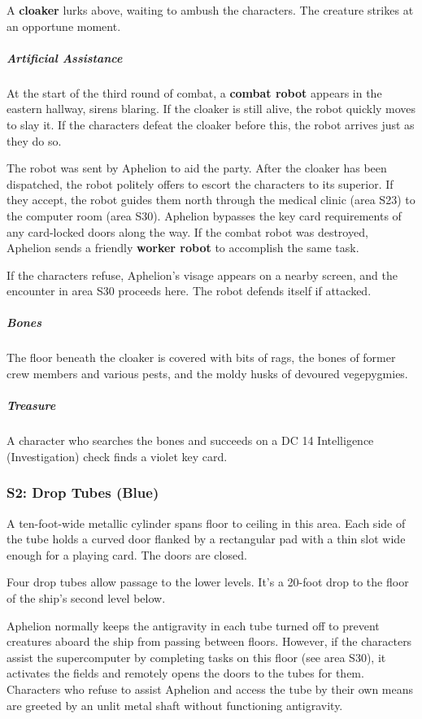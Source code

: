 \documentclass[10pt,a4paper,twoside,bg=print,twocolumn,openany,nodeprecatedcode]{dndbook}
\begin{document}
A \textbf{cloaker} lurks above, waiting to ambush the characters. The creature strikes at an opportune moment.

\subparagraph{Artificial Assistance}
At the start of the third round of combat, a \textbf{combat robot} appears in the eastern hallway, sirens blaring. If the cloaker is still alive, the robot quickly moves to slay it. If the characters defeat the cloaker before this, the robot arrives just as they do so.

The robot was sent by Aphelion to aid the party. After the cloaker has been dispatched, the robot politely offers to escort the characters to its superior. If they accept, the robot guides them north through the medical clinic (area S23) to the computer room (area S30). Aphelion bypasses the key card requirements of any card-locked doors along the way. If the combat robot was destroyed, Aphelion sends a friendly \textbf{worker robot} to accomplish the same task.

If the characters refuse, Aphelion's visage appears on a nearby screen, and the encounter in area S30 proceeds here. The robot defends itself if attacked.

\subparagraph{Bones}
The floor beneath the cloaker is covered with bits of rags, the bones of former crew members and various pests, and the moldy husks of devoured vegepygmies.

\subparagraph{Treasure}
A character who searches the bones and succeeds on a DC 14 Intelligence (Investigation) check finds a violet key card.

\subsubsection{S2: Drop Tubes (Blue)}
\begin{DndReadAloud}{}
A ten-foot-wide metallic cylinder spans floor to ceiling in this area. Each side of the tube holds a curved door flanked by a rectangular pad with a thin slot wide enough for a playing card. The doors are closed.

\end{DndReadAloud}

Four drop tubes allow passage to the lower levels. It's a 20-foot drop to the floor of the ship's second level below.

Aphelion normally keeps the antigravity in each tube turned off to prevent creatures aboard the ship from passing between floors. However, if the characters assist the supercomputer by completing tasks on this floor (see area S30), it activates the fields and remotely opens the doors to the tubes for them. Characters who refuse to assist Aphelion and access the tube by their own means are greeted by an unlit metal shaft without functioning antigravity.
\end{document}
